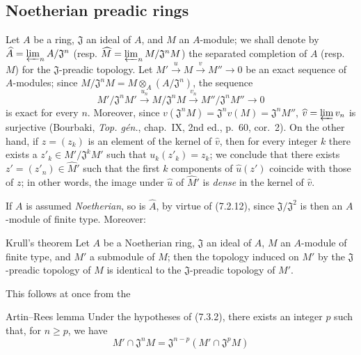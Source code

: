 \subsection{Noetherian preadic rings}
\label{subsection:0.7.3}

\begin{env}[7.3.1]
\label{0.7.3.1}
Let $A$ be a ring, $\mathfrak J$ an ideal of $A$, and $M$ an $A$-module;
we shall denote by
$\widehat A=\varprojlim_n A/\mathfrak J^n$ (resp.
$\widehat M=\varprojlim_n M/\mathfrak J^nM$) the separated completion of $A$
(resp. $M$) for the $\mathfrak J$-preadic topology. Let $M'\xrightarrow{u}M\xrightarrow{v}M''\to0$
be an exact sequence of $A$-modules; since
$M/\mathfrak J^nM=M\otimes_A(A/\mathfrak J^n)$, the sequence
\[
  M'/\mathfrak J^nM'\xrightarrow{u_n}
  M/\mathfrak J^nM\xrightarrow{v_n}
  M''/\mathfrak J^nM''\to0
\]
is exact for every $n$. Moreover, since
$v(\mathfrak J^nM)=\mathfrak J^nv(M)=\mathfrak J^nM''$,
$\widehat v=\varprojlim v_n$ is surjective (Bourbaki,
\emph{Top. gén.}, chap.~IX, 2nd ed., p.~60, cor.~2).
On the other hand, if $z=(z_k)$ is an element of the kernel of $\widehat v$, then for every
integer $k$ there exists a $z'_k\in M'/\mathfrak J^kM'$ such that
$u_k(z'_k)=z_k$; we conclude that there exists
$z'=(z'_n)\in\widehat{M}'$ such that the first $k$ components of
$\widehat u(z')$ coincide with those of $z$; in other words, the image under
$\widehat u$ of $\widehat{M}'$ is \emph{dense} in the kernel of
$\widehat v$.

If $A$ is assumed \emph{Noetherian}, so is $\widehat A$, by
virtue of (7.2.12), since $\mathfrak J/\mathfrak J^2$ is then an $A$-module of
finite type. Moreover:
\end{env}

\begin{namedtheorem}[7.3.2]{Krull's theorem}
\label{0.7.3.2}
Let $A$ be a \textup{Noetherian} ring, $\mathfrak J$ an ideal of $A$, $M$ an
$A$-module \textup{of finite type}, and $M'$ a submodule of $M$; then the topology
induced on $M'$ by the $\mathfrak J$-preadic topology of $M$ is identical
to the $\mathfrak J$-preadic topology of $M'$.
\end{namedtheorem}

This follows at once from the

\begin{namedlemma}[7.3.2.1]{Artin--Rees lemma}
\label{0.7.3.2.1}
Under the hypotheses of \textup{(7.3.2)}, there exists an integer $p$ such that, for
$n\geq p$, we have
\[
  M'\cap\mathfrak J^nM=\mathfrak J^{n-p}
  (M'\cap\mathfrak J^pM)
\]
\end{namedlemma}

